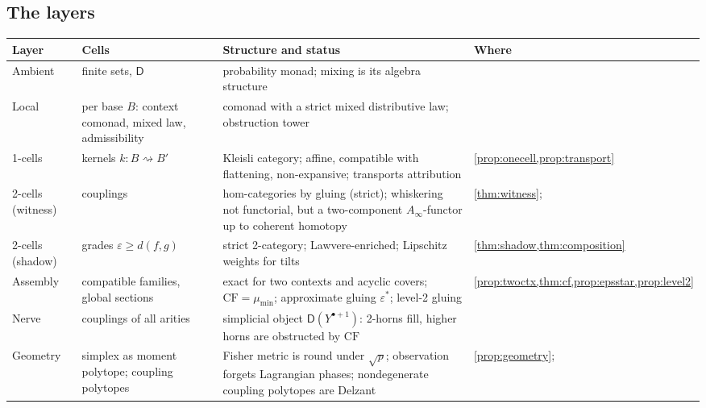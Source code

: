 \documentclass[11pt]{article}
\theoremstyle{definition}
\theoremstyle{remark}
\newcommand{\D}{\mathsf{D}}
\begin{document}
\subsection{The layers}

\begin{center}\small
\begin{tabular}{@{}R{0.13\textwidth}R{0.24\textwidth}R{0.37\textwidth}R{0.17\textwidth}@{}}
\toprule
Layer & Cells & Structure and status & Where\\
\midrule
Ambient & finite sets, $\D$ & probability monad; mixing is its algebra structure & \cite{Awasthi-Tower}\\
Local & per base $B$: context comonad, mixed law, admissibility & comonad with a strict mixed
distributive law; obstruction tower & \cite[\S\S9--10]{Awasthi-Tower}\\
1-cells & kernels $k\colon B\rightsquigarrow B'$ & Kleisli category; affine, compatible with flattening,
non-expansive; transports attribution & \cref{prop:onecell,prop:transport}\\
2-cells (witness) & couplings & hom-categories by gluing (strict); whiskering not functorial, but a
two-component $A_\infty$-functor up to coherent homotopy & \cref{thm:witness}; \cite[Thm.~5.2]{Awasthi-Conditionals}\\
2-cells (shadow) & grades $\varepsilon\ge d(f,g)$ & strict 2-category; Lawvere-enriched; Lipschitz
weights for tilts & \cref{thm:shadow,thm:composition}\\
Assembly & compatible families, global sections & exact for two contexts and acyclic covers;
$\mathrm{CF}=\mu_{\min}$; approximate gluing $\varepsilon^*$; level-2 gluing &
\cref{prop:twoctx,thm:cf,prop:epsstar,prop:level2}\\
Nerve & couplings of all arities & simplicial object $\D(Y^{\bullet+1})$: 2-horns fill, higher horns are obstructed
by $\mathrm{CF}$ & \cite[\S4]{Awasthi-Conditionals}\\
Geometry & simplex as moment polytope; coupling polytopes & Fisher metric is round under $\sqrt p$; observation forgets
Lagrangian phases; nondegenerate coupling polytopes are Delzant & \cref{prop:geometry}; \cite[\S6]{Awasthi-Conditionals}\\
\bottomrule
\end{tabular}
\end{center}
\end{document}
